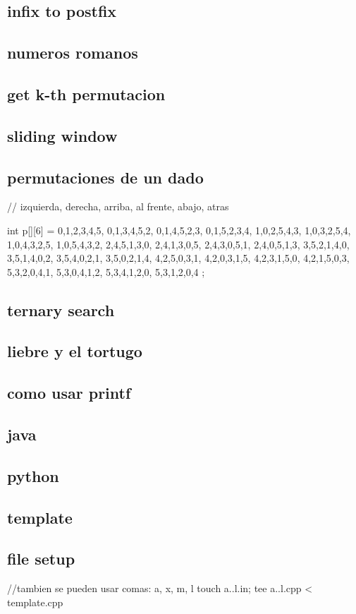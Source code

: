 \subsection{infix to postfix}
\subsection{numeros romanos}
\subsection{get k-th permutacion}
\subsection{sliding window}
\subsection{permutaciones de un dado}
\begin{code}
// izquierda, derecha, arriba, al frente, abajo, atras

int p[][6] = {
    {0,1,2,3,4,5},
    {0,1,3,4,5,2},
    {0,1,4,5,2,3},
    {0,1,5,2,3,4},
    {1,0,2,5,4,3},
    {1,0,3,2,5,4},
    {1,0,4,3,2,5},
    {1,0,5,4,3,2},
    {2,4,5,1,3,0},
    {2,4,1,3,0,5},
    {2,4,3,0,5,1},
    {2,4,0,5,1,3},
    {3,5,2,1,4,0},
    {3,5,1,4,0,2},
    {3,5,4,0,2,1},
    {3,5,0,2,1,4},
    {4,2,5,0,3,1},
    {4,2,0,3,1,5},
    {4,2,3,1,5,0},
    {4,2,1,5,0,3},
    {5,3,2,0,4,1},
    {5,3,0,4,1,2},
    {5,3,4,1,2,0},
    {5,3,1,2,0,4}
};
\end{code}
\subsection{ternary search}
\subsection{liebre y el tortugo}
\subsection{como usar printf}
\subsection{java}
\subsection{python}
\subsection{template}
\subsection{file setup}
\begin{code}
//tambien se pueden usar comas: {a, x, m, l}
touch {a..l}.in; tee {a..l}.cpp < template.cpp
\end{code}

